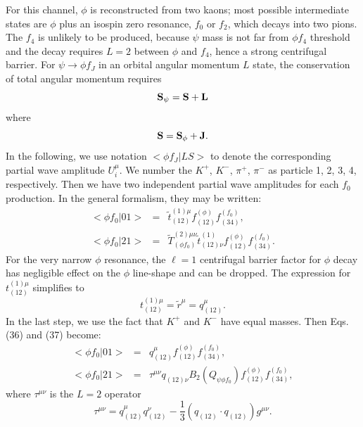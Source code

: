 For this channel, $\phi$ is reconstructed from two kaons; most
possible intermediate states are $\phi$ plus an isospin zero
resonance, $f_0$ or $f_2$, which decays into two pions. The $f_4$
is unlikely to be produced, because $\psi$ mass is not far from
$\phi f_4$ threshold and the decay requires $L=2$ between $\phi$
and $f_4$, hence a strong centrifugal barrier. For $\psi\to\phi
f_J$ in an orbital angular momentum $L$ state, the conservation of
total angular momentum requires
\begin{equation}
\bf S_\psi = S+L
\end{equation}
where
\begin{equation}
\bf S=S_\phi + J.
\end{equation}
In the following, we use notation $<\phi f_J|LS>$ to denote the
corresponding partial wave amplitude $U_i^\mu$. We number the
$K^+$, $K^-$, $\pi^+$, $\pi^-$ as particle 1, 2, 3, 4,
respectively. Then we have two independent partial wave amplitudes
for each $f_0$ production. In the general formalism, they may be
written:
\begin{eqnarray}
<\phi f_0|01> \!&=&\! \tilde t^{(1)\mu}_{(12)}f_{(12)}^{(\phi)}f_{(34)}^{(f_0)}, \\
<\phi f_0|21> \!&=&\! \tilde T^{(2)\mu\nu}_{(\phi f_0)}\tilde
t^{(1)}_{(12)\nu}f_{(12)}^{(\phi)} f_{(34)}^{(f_0)}.
\end{eqnarray}
For the very narrow $\phi$ resonance, the $\ell = 1$ centrifugal
barrier factor for $\phi$ decay has negligible effect on the
$\phi$ line-shape and can be dropped. The expression for
$t^{(1)\mu}_{(12)}$ simplifies to
$$t^{(1)\mu}_{(12)} = \tilde r^\mu=q_{(12)}^\mu.$$
In the last step, we use the fact that $K^+$ and $K^-$ have equal
masses. Then Eqs. (36) and (37) become:
\begin{eqnarray}
<\phi f_0|01> \!&=&\! q^\mu_{(12)} f_{(12)}^{(\phi)}f_{(34)}^{(f_0)}, \\
<\phi f_0|21> \!&=&\! \tau ^{\mu \nu}q_{(12)\nu}
            B_2(Q_{\psi\phi f_0})f_{(12)}^{(\phi)} f_{(34)}^{(f_0)},
\end{eqnarray}
where $\tau ^{\mu \nu}$ is the $L = 2$ operator
\begin {equation}
\tau ^{\mu \nu } = q^\mu_{(12)} q^\nu_{(12)} - \frac
{1}{3}(q_{(12)}\cdot q_{(12)}) g^{\mu \nu }.
\end {equation}

